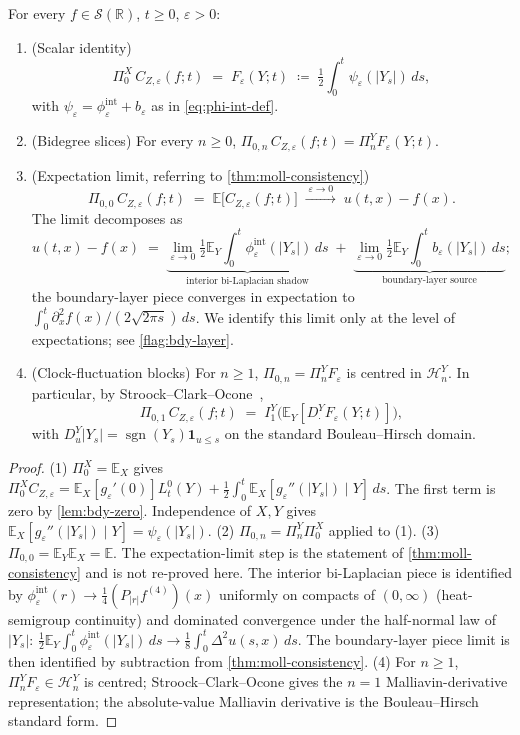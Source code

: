 \documentclass[EJP]{ejpecp}
\newcommand{\R}{\mathbb{R}}
\renewcommand{\E}{\mathbb{E}}
\newcommand{\Hilb}{\mathcal{H}}
\newcommand{\IBM}{Z}
\newcommand{\Pir}{\Pi}
\DeclareMathOperator{\sgn}{sgn}
\begin{document}
\begin{theorem}
\label{thm:pure-clock}
For every $f\in\mathscr S(\R)$, $t\ge 0$, $\varepsilon>0$:
\begin{enumerate}
\item (Scalar identity)
\[
 \Pir_0^X\,C_{\IBM,\varepsilon}(f;t)
 \;=\;F_\varepsilon(Y;t)
 \;\coloneqq\;\tfrac12\!\int_0^t\!\psi_\varepsilon(|Y_s|)\,ds,
\]
with $\psi_\varepsilon=\phi_\varepsilon^{\mathrm{int}}+b_\varepsilon$
as in \eqref{eq:phi-int-def}.
\item (Bidegree slices) For every $n\ge 0$,
$\Pir_{0,n}\,C_{\IBM,\varepsilon}(f;t)=\Pir_n^Y F_\varepsilon(Y;t)$.
\item (Expectation limit, referring to \cref{thm:moll-consistency})
\[
 \Pir_{0,0}\,C_{\IBM,\varepsilon}(f;t)
 \;=\;\E\!\bigl[C_{\IBM,\varepsilon}(f;t)\bigr]
 \;\xrightarrow{\;\varepsilon\to 0\;}\;u(t,x)-f(x).
\]
The limit decomposes as
\[
 u(t,x)-f(x)
 \;=\;\underbrace{\lim_{\varepsilon\to 0}\tfrac12\E_Y\!\int_0^t\phi_\varepsilon^{\mathrm{int}}(|Y_s|)\,ds}_{\text{interior bi-Laplacian shadow}}
   \;+\;\underbrace{\lim_{\varepsilon\to 0}\tfrac12\E_Y\!\int_0^t b_\varepsilon(|Y_s|)\,ds}_{\text{boundary-layer source}};
\]
the boundary-layer piece converges in expectation to
$\int_0^t\partial_x^{2}f(x)/(2\sqrt{2\pi s})\,ds$. We identify this
limit only at the level of expectations; see \cref{flag:bdy-layer}.
\item (Clock-fluctuation blocks) For $n\ge 1$,
$\Pir_{0,n}=\Pir_n^Y F_\varepsilon$ is centred in $\Hilb_n^Y$. In
particular, by Stroock--Clark--Ocone~\cite{Nualart},
\[
 \Pir_{0,1}\,C_{\IBM,\varepsilon}(f;t)
 \;=\;I_1^Y\!\bigl(\E_Y[D^Y_\cdot F_\varepsilon(Y;t)]\bigr),
\]
with $D^Y_u|Y_s|=\sgn(Y_s)\mathbf 1_{u\le s}$ on the standard
Bouleau--Hirsch domain.
\end{enumerate}
\end{theorem}

\begin{proof}
(1) $\Pir_0^X=\E_X$ gives
$\Pir_0^X C_{\IBM,\varepsilon}=\E_X[g_\varepsilon'(0)]L_t^{0}(Y)
+\tfrac12\!\int_0^t\E_X[g_\varepsilon''(|Y_s|)\mid Y]\,ds$. The first
term is zero by \cref{lem:bdy-zero}. Independence of $X,Y$ gives
$\E_X[g_\varepsilon''(|Y_s|)\mid Y]=\psi_\varepsilon(|Y_s|)$.
(2) $\Pir_{0,n}=\Pir_n^Y\Pir_0^X$ applied to (1).
(3) $\Pir_{0,0}=\E_Y\E_X=\E$. The expectation-limit step is the
statement of \cref{thm:moll-consistency} and is not re-proved here.
The interior bi-Laplacian piece is identified by
$\phi_\varepsilon^{\mathrm{int}}(r)\to\tfrac14(P_{|r|}f^{(4)})(x)$
uniformly on compacts of $(0,\infty)$ (heat-semigroup continuity)
and dominated convergence under the half-normal law of $|Y_s|$:
$\tfrac12\E_Y\!\int_0^t\phi_\varepsilon^{\mathrm{int}}(|Y_s|)\,ds\to
\tfrac18\!\int_0^t\Delta^{2}u(s,x)\,ds$. The boundary-layer piece
limit is then identified by subtraction from \cref{thm:moll-consistency}.
(4) For $n\ge 1$, $\Pir_n^Y F_\varepsilon\in\Hilb_n^Y$ is centred;
Stroock--Clark--Ocone gives the $n=1$ Malliavin-derivative
representation; the absolute-value Malliavin derivative is the
Bouleau--Hirsch standard form.
\end{proof}
\end{document}
